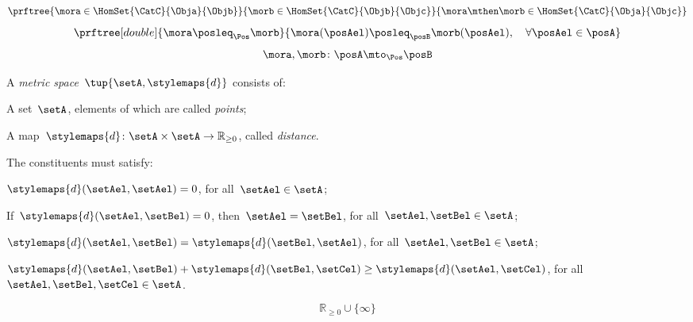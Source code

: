 {\begin{forslides}
\begin{equation*}
            \label{eq:poset_bool_m}
            \prftree{\mora \in \HomSet{\CatC}{\Obja}{\Objb}}{\morb \in \HomSet{\CatC}{\Objb}{\Objc}}{{\mora\mthen \morb \in \HomSet{\CatC}{\Obja}{\Objc}}}
        \end{equation*}
        \begin{equation*}
            \label{eq:poset_pos_a}
            \prftree[double]{\mora \posleq_\Pos \morb}{\mora(\posAel)\posleq_\posB \morb(\posAel), \quad \forall \posAel \in \posA}
        \end{equation*}
        \begin{equation*}
            \label{eq:poset_pos_b}
            \mora,\morb\colon \posA\mto_\Pos \posB
        \end{equation*}
        \begin{definition}
            \label{def:metric_space}
            A \emph{metric space}~$\tup{\setA,\stylemaps{d}}$ consists of:
            \begin{compactenum}
                \item A set~$\setA$, elements of which are called \emph{points};
                \item A map~$\stylemaps{d}\colon \setA\times \setA \to \mathbb{R}_{\geq 0}$, called \emph{distance}.
            \end{compactenum}
            The constituents must satisfy:
            \begin{compactitem}
                \item $\stylemaps{d}(\setAel,\setAel)=0$, for all~$\setAel\in \setA$;
                \item If~$\stylemaps{d}(\setAel, \setBel)=0$, then~$\setAel=\setBel$, for all~$\setAel,\setBel\in \setA$;
                \item $\stylemaps{d}(\setAel, \setBel)=\stylemaps{d}(\setBel, \setAel)$, for all~$\setAel,\setBel\in \setA$;
                \item $\stylemaps{d}(\setAel, \setBel)+\stylemaps{d}(\setBel, \setCel)\geq \stylemaps{d}(\setAel, \setCel)$, for all~$\setAel,\setBel,\setCel\in \setA$.
            \end{compactitem}
        \end{definition}
        \begin{equation*}
            \label{eq:r_with_inft}
            \mathbb{R}_{\geq 0}\cup \{\infty\}
        \end{equation*}
        \begin{equation*}
            \label{eq:cost_cat}

\end{equation*}
\end{forslides}}
